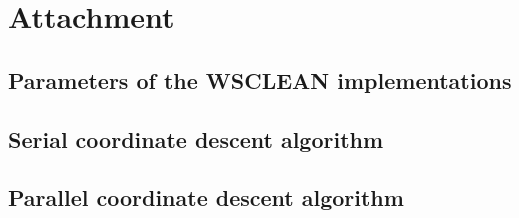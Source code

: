 \pagebreak
\section*{Attachment}

\subsection{Parameters of the WSCLEAN implementations}


\subsection{Serial coordinate descent algorithm}


\subsection{Parallel coordinate descent algorithm}
\pagebreak
